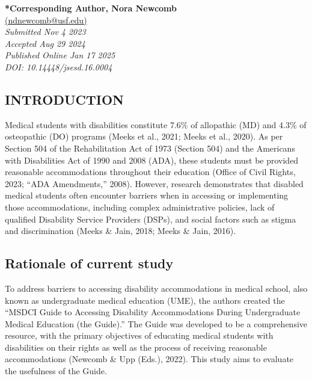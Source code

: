 \documentclass[11.5pt]{sig-alternate} %
\begin{document}
\textbf{*Corresponding Author, Nora Newcomb}\\ %
\href{mailto:ndnewcomb@usf.edu}{(ndnewcomb@usf.edu)} \\ %
\textit{Submitted Nov 4 2023} \\ %
\textit{Accepted Aug 29 2024} \\ %
\textit{Published Online Jan 17 2025} \\ %
\textit{DOI: 10.14448/jsesd.16.0004} \\ %
\pagebreak 
\clearpage %
\begin{large}

\section*{INTRODUCTION}
Medical students with disabilities constitute 7.6\% of allopathic (MD) and 4.3\% of osteopathic (DO) programs (Meeks et al., 2021; Meeks et al., 2020). As per Section 504 of the Rehabilitation Act of 1973 (Section 504) and the Americans with Disabilities Act of 1990 and 2008 (ADA), these students must be provided reasonable accommodations throughout their education (Office of Civil Rights, 2023; “ADA Amendments,” 2008). However, research demonstrates that disabled medical students often encounter barriers when in accessing or implementing those accommodations, including complex administrative policies, lack of qualified Disability Service Providers (DSPs), and social factors such as stigma and discrimination (Meeks \& Jain, 2018; Meeks \& Jain, 2016).
\\
\subsection*{Rationale of current study}
To address barriers to accessing disability accommodations in medical school, also known as undergraduate medical education (UME), the authors created the “MSDCI Guide to Accessing Disability Accommodations During Undergraduate Medical Education (the Guide).” The Guide was developed to be a comprehensive resource, with the primary objectives of educating medical students with disabilities on their rights as well as the process of receiving reasonable accommodations (Newcomb \& Upp (Eds.), 2022). This study aims to evaluate the usefulness of the Guide.


\end{large}
\end{document}
